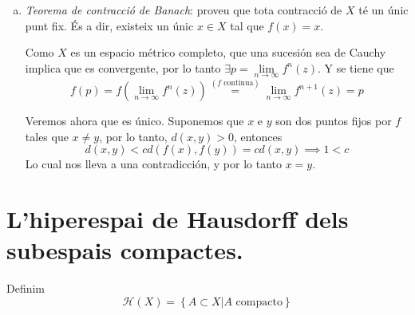 \documentclass[12pt]{article}
\newcommand{\h}{\mathscr{H}}
\newcommand\setb[1]{\left\{#1\right\}}
\theoremstyle{break}
\begin{document}
\begin{enumerate}[a)]
\item\label{item:teob} \emph{Teorema de contracció de Banach}: proveu que tota contracció de $X$ té un únic punt fix.
	És a dir, existeix un únic $x \in X$ tal que $f(x) = x$.

	Como $X$ es un espacio métrico completo, que una sucesión sea de Cauchy implica que es convergente,
	por lo tanto $\exists p = \lim\limits_{n \to \infty} f^n(z)$. Y se tiene que 
	\[
		f(p) = f\left( \lim_{n \to \infty} f^n(z) \right) \stackrel{(f \text{ continua})}{=} \lim_{n \to \infty} f^{n+1}(z) = p
	\]

	Veremos ahora que es único. Suponemos que $x$ e $y$ son dos puntos fijos por $f$ tales que $x \neq y$,
	por lo tanto, $d(x, y) > 0$, entonces
	\[
		d(x, y) < c d\left( f(x), f(y) \right) = c d(x, y) \implies 1 < c
	\]
	Lo cual nos lleva a una contradicción, y por lo tanto $x = y$.
\end{enumerate}

\section{L’hiperespai de Hausdorff dels subespais compactes.}
Definim
\[
	\h(X) = \setb{A \subset X \vert A \text{ compacto}}
\]
\end{document}
